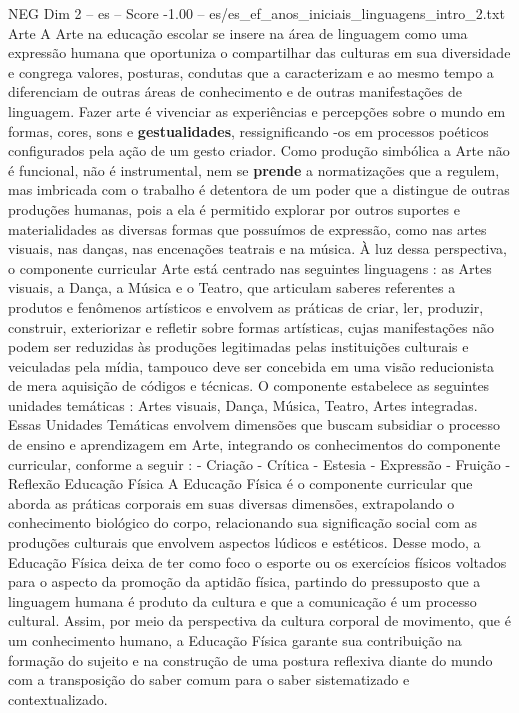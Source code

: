 \begin{textsample}{NEG Dim 2 – es – Score -1.00 – es/es\_ef\_anos\_iniciais\_linguagens\_intro\_2.txt}  \label{ex:f2_neg_074}
Arte A Arte na educação escolar se insere na área de linguagem como uma expressão humana que oportuniza o compartilhar das culturas em sua diversidade e congrega valores, posturas, condutas que a caracterizam e ao mesmo tempo a diferenciam de outras áreas de conhecimento e de outras manifestações de linguagem.
Fazer arte é vivenciar as experiências e percepções sobre o mundo em formas, cores, sons e \textbf{gestualidades}, ressignificando -os em processos poéticos configurados pela ação de um gesto criador.
Como produção simbólica a Arte não é funcional, não é instrumental, nem se \textbf{prende} a normatizações que a regulem, mas imbricada com o trabalho é detentora de um poder que a distingue de outras produções humanas, pois a ela é permitido explorar por outros suportes e materialidades as diversas formas que possuímos de expressão, como nas artes visuais, nas danças, nas encenações teatrais e na música.
À luz dessa perspectiva, o componente curricular Arte está centrado nas seguintes linguagens : as Artes visuais, a Dança, a Música e o Teatro, que articulam saberes referentes a produtos e fenômenos artísticos e envolvem as práticas de criar, ler, produzir, construir, exteriorizar e refletir sobre formas artísticas, cujas manifestações não podem ser reduzidas às produções legitimadas pelas instituições culturais e veiculadas pela mídia, tampouco deve ser concebida em uma visão reducionista de mera aquisição de códigos e técnicas.
O componente estabelece as seguintes unidades temáticas : Artes visuais, Dança, Música, Teatro, Artes integradas.
Essas Unidades Temáticas envolvem dimensões que buscam subsidiar o processo de ensino e aprendizagem em Arte, integrando os conhecimentos do componente curricular, conforme a seguir : - Criação - Crítica - Estesia - Expressão - Fruição - Reflexão Educação Física A Educação Física é o componente curricular que aborda as práticas corporais em suas diversas dimensões, extrapolando o conhecimento biológico do corpo, relacionando sua significação social com as produções culturais que envolvem aspectos lúdicos e estéticos.
Desse modo, a Educação Física deixa de ter como foco o esporte ou os exercícios físicos voltados para o aspecto da promoção da aptidão física, partindo do pressuposto que a linguagem humana é produto da cultura e que a comunicação é um processo cultural.
Assim, por meio da perspectiva da cultura corporal de movimento, que é um conhecimento humano, a Educação Física garante sua contribuição na formação do sujeito e na construção de uma postura reflexiva diante do mundo com a transposição do saber comum para o saber sistematizado e contextualizado.

\end{textsample}

